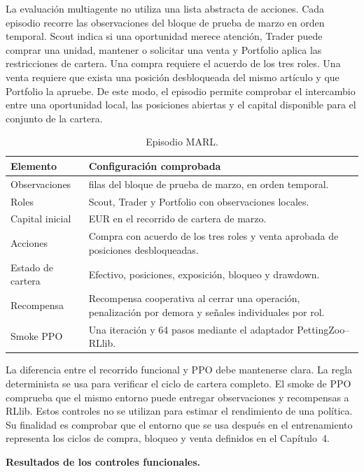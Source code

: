 La evaluación multiagente no utiliza una lista abstracta de acciones. Cada episodio recorre las observaciones del bloque de prueba de marzo en orden temporal. Scout indica si una oportunidad merece atención, Trader puede comprar una unidad, mantener o solicitar una venta y Portfolio aplica las restricciones de cartera. Una compra requiere el acuerdo de los tres roles. Una venta requiere que exista una posición desbloqueada del mismo artículo y que Portfolio la apruebe. De este modo, el episodio permite comprobar el intercambio entre una oportunidad local, las posiciones abiertas y el capital disponible para el conjunto de la cartera.

\begin{table}[htbp]
\centering
\begin{tabularx}{\textwidth}{>{\raggedright\arraybackslash}p{} >{\raggedright\arraybackslash}X}
\toprule
Elemento & Configuración comprobada \\
\midrule
Observaciones & 95 filas del bloque de prueba de marzo, en orden temporal. \\
Roles & Scout, Trader y Portfolio con observaciones locales. \\
Capital inicial & 1.000 EUR en el recorrido de cartera de marzo. \\
Acciones & Compra con acuerdo de los tres roles y venta aprobada de posiciones desbloqueadas. \\
Estado de cartera & Efectivo, posiciones, exposición, bloqueo y drawdown. \\
Recompensa & Recompensa cooperativa al cerrar una operación, penalización por demora y señales individuales por rol. \\
Smoke PPO & Una iteración y 64 pasos mediante el adaptador PettingZoo--RLlib. \\
\bottomrule
\end{tabularx}
\caption{Episodio MARL.}
\label{tab:protocolo-marl}
\end{table}

La diferencia entre el recorrido funcional y PPO debe mantenerse clara. La regla determinista se usa para verificar el ciclo de cartera completo. El smoke de PPO comprueba que el mismo entorno puede entregar observaciones y recompensas a RLlib. Estos controles no se utilizan para estimar el rendimiento de una política. Su finalidad es comprobar que el entorno que se usa después en el entrenamiento representa los ciclos de compra, bloqueo y venta definidos en el Capítulo~4.

\textbf{Resultados de los controles funcionales.}

